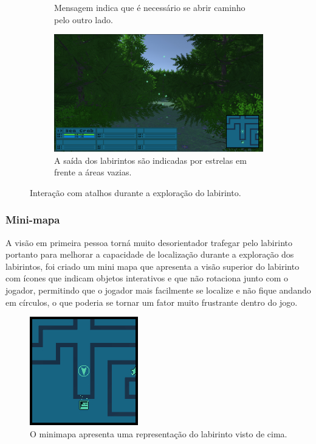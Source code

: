 \documentclass[
	12pt,				%
	openright,			%
	twoside,			%
	a4paper,			%
	english,			%
	french,				%
	spanish,			%
	brazil				%
	]{abntex2}
\begin{document}
\begin{figure}[h!]
\begin{subfigure}[b]{0.47\linewidth}
    \caption{Mensagem indica que é necessário se abrir caminho pelo outro lado.}
  \end{subfigure}
  \begin{subfigure}[b]{0.47\linewidth}
    \includegraphics[width=\linewidth]{exit.jpg}
    \caption{A saída dos labirintos são indicadas por estrelas em frente a áreas vazias.}
  \end{subfigure}
  \caption{Interação com atalhos durante a exploração do labirinto.}
  \label{fig:shortcut}
\end{figure}
\pagebreak
\subsubsection{Mini-mapa}

A visão em primeira pessoa torná muito desorientador trafegar pelo labirinto portanto para melhorar a capacidade de localização durante a exploração dos labirintos, foi criado um mini mapa que apresenta a visão superior do labirinto com ícones que indicam objetos interativos e que não rotaciona junto com o jogador, permitindo que o jogador mais facilmente se localize e não fique andando em círculos, o que poderia se tornar um fator muito frustrante dentro do jogo.

\begin{figure}[h!]
 \centering
  \includegraphics[width=0.4\linewidth]{minimap.jpg}
  \caption{O minimapa apresenta uma representação do labirinto visto de cima.}
  \label{fig:minimapa1}
\end{figure}
\end{document}
